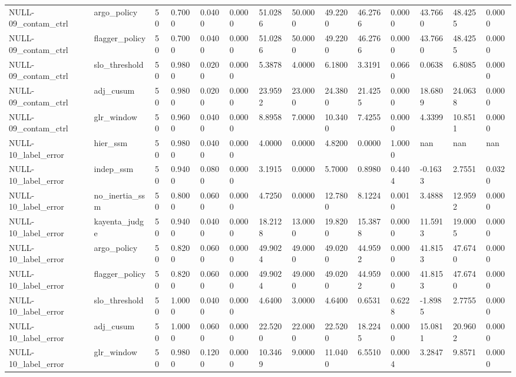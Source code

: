 \begin{table}[htbp]
\begin{tabular}{llllllllllllll}
NULL-09\_contam\_ctrl & argo\_policy & 50 & 0.7000 & 0.0400 & 0.0000 & 51.0286 & 50.0000 & 49.2200 & 46.2766 & 0.0000 & 43.7660 & 48.4255 & 0.0000 \\
NULL-09\_contam\_ctrl & flagger\_policy & 50 & 0.7000 & 0.0400 & 0.0000 & 51.0286 & 50.0000 & 49.2200 & 46.2766 & 0.0000 & 43.7660 & 48.4255 & 0.0000 \\
NULL-09\_contam\_ctrl & slo\_threshold & 50 & 0.9800 & 0.0200 & 0.0000 & 5.3878 & 4.0000 & 6.1800 & 3.3191 & 0.0660 & 0.0638 & 6.8085 & 0.0000 \\
NULL-09\_contam\_ctrl & adj\_cusum & 50 & 0.9800 & 0.0200 & 0.0000 & 23.9592 & 23.0000 & 24.3800 & 21.4255 & 0.0000 & 18.6809 & 24.0638 & 0.0000 \\
NULL-09\_contam\_ctrl & glr\_window & 50 & 0.9600 & 0.0400 & 0.0000 & 8.8958 & 7.0000 & 10.3400 & 7.4255 & 0.0000 & 4.3399 & 10.8511 & 0.0000 \\
NULL-10\_label\_error & hier\_ssm & 50 & 0.9800 & 0.0400 & 0.0000 & 4.0000 & 0.0000 & 4.8200 & 0.0000 & 1.0000 & nan & nan & nan \\
NULL-10\_label\_error & indep\_ssm & 50 & 0.9400 & 0.0800 & 0.0000 & 3.1915 & 0.0000 & 5.7000 & 0.8980 & 0.4404 & -0.1633 & 2.7551 & 0.0320 \\
NULL-10\_label\_error & no\_inertia\_ssm & 50 & 0.8000 & 0.0600 & 0.0000 & 4.7250 & 0.0000 & 12.7800 & 8.1224 & 0.0010 & 3.4888 & 12.9592 & 0.0000 \\
NULL-10\_label\_error & kayenta\_judge & 50 & 0.9400 & 0.0400 & 0.0000 & 18.2128 & 13.0000 & 19.8200 & 15.3878 & 0.0000 & 11.5913 & 19.0005 & 0.0000 \\
NULL-10\_label\_error & argo\_policy & 50 & 0.8200 & 0.0600 & 0.0000 & 49.9024 & 49.0000 & 49.0200 & 44.9592 & 0.0000 & 41.8153 & 47.6740 & 0.0000 \\
NULL-10\_label\_error & flagger\_policy & 50 & 0.8200 & 0.0600 & 0.0000 & 49.9024 & 49.0000 & 49.0200 & 44.9592 & 0.0000 & 41.8153 & 47.6740 & 0.0000 \\
NULL-10\_label\_error & slo\_threshold & 50 & 1.0000 & 0.0400 & 0.0000 & 4.6400 & 3.0000 & 4.6400 & 0.6531 & 0.6228 & -1.8985 & 2.7755 & 0.0000 \\
NULL-10\_label\_error & adj\_cusum & 50 & 1.0000 & 0.0600 & 0.0000 & 22.5200 & 22.0000 & 22.5200 & 18.2245 & 0.0000 & 15.0811 & 20.9602 & 0.0000 \\
NULL-10\_label\_error & glr\_window & 50 & 0.9800 & 0.1200 & 0.0000 & 10.3469 & 9.0000 & 11.0400 & 6.5510 & 0.0004 & 3.2847 & 9.8571 & 0.0000 \\

\end{tabular}
\end{table}
